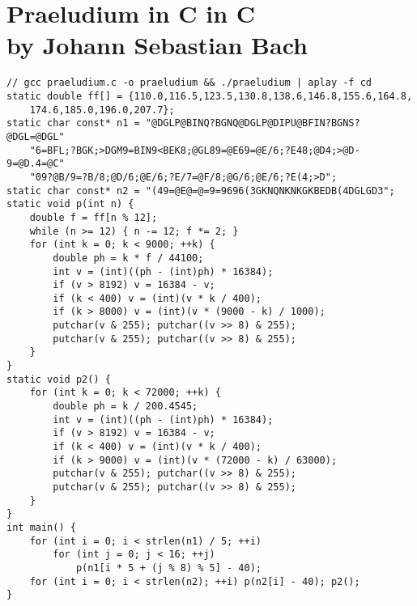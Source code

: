 \documentclass[a4paper,parskip,headheight=38pt]{scrartcl} %
\begin{document}
\section*{Praeludium in C in C \\ by Johann Sebastian Bach}

\begin{verbatim}
// gcc praeludium.c -o praeludium && ./praeludium | aplay -f cd
static double ff[] = {110.0,116.5,123.5,130.8,138.6,146.8,155.6,164.8,
    174.6,185.0,196.0,207.7};
static char const* n1 = "@DGLP@BINQ?BGNQ@DGLP@DIPU@BFIN?BGNS?@DGL=@DGL"
    "6=BFL;?BGK;>DGM9=BIN9<BEK8;@GL89=@E69=@E/6;?E48;@D4;>@D-9=@D.4=@C"
    "09?@B/9=?B/8;@D/6;@E/6;?E/7=@F/8;@G/6;@E/6;?E(4;>D";
static char const* n2 = "(49=@E@=@=9=9696(3GKNQNKNKGKBEDB(4DGLGD3";
static void p(int n) {
    double f = ff[n % 12];
    while (n >= 12) { n -= 12; f *= 2; }
    for (int k = 0; k < 9000; ++k) {
        double ph = k * f / 44100;
        int v = (int)((ph - (int)ph) * 16384);
        if (v > 8192) v = 16384 - v;
        if (k < 400) v = (int)(v * k / 400);
        if (k > 8000) v = (int)(v * (9000 - k) / 1000);
        putchar(v & 255); putchar((v >> 8) & 255);
        putchar(v & 255); putchar((v >> 8) & 255);
    }
}
static void p2() {
    for (int k = 0; k < 72000; ++k) {
        double ph = k / 200.4545;
        int v = (int)((ph - (int)ph) * 16384);
        if (v > 8192) v = 16384 - v;
        if (k < 400) v = (int)(v * k / 400);
        if (k > 9000) v = (int)(v * (72000 - k) / 63000);
        putchar(v & 255); putchar((v >> 8) & 255);
        putchar(v & 255); putchar((v >> 8) & 255);
    }
}
int main() {
    for (int i = 0; i < strlen(n1) / 5; ++i)
        for (int j = 0; j < 16; ++j)
            p(n1[i * 5 + (j % 8) % 5] - 40);
    for (int i = 0; i < strlen(n2); ++i) p(n2[i] - 40); p2();
}
\end{verbatim}
\end{document}
